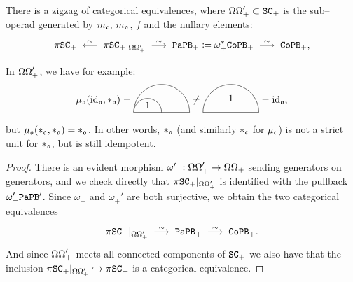 \begin{proposition} \label{sw.prop.zigzag-unit}
  There is a zigzag of categorical equivalences, where ${\Omega\Omega}_{+}' \subset \mathtt{SC}_{+}$ is the sub--operad generated by $m_{\mathfrak{c}}$, $m_{\mathfrak{o}}$, $f$ and the nullary elements:
  \[ \pi \SC_{+} \qiso* \pi \SC_{+}|_{\tMagma_{+}'} \qiso \PaPB_{+} \coloneqq \omega_{+}^{*} \CoPB_{+} \qiso \CoPB_{+}, \]
\end{proposition}

\begin{remark}
  In ${\Omega\Omega}_{+}'$, we have for example:
  \[ \mu_{\col{o}}(\id_{\col o}, *_{\col o}) =
    \begin{gathered} \begin{tikzpicture}
        \draw (-1,0) -- (1,0); \draw (1,0) arc (0:180:1);
        \draw (0,0) arc (0:180:0.5); \draw (-0.5, 0.25) node {1};
      \end{tikzpicture} \end{gathered}
    \neq
    \begin{gathered} \begin{tikzpicture}
        \draw (-1,0) -- (1,0); \draw (1,0) arc (0:180:1);
        \draw (0,0.5) node {1};
      \end{tikzpicture} \end{gathered}
    = \id_{\col{o}},
  \]
  but $\mu_{\mathfrak{o}}(*_{\mathfrak{o}}, *_{\mathfrak{o}}) = *_{\mathfrak{o}}$.
 In other words, $*_{\mathfrak{o}}$ (and similarly $*_{\mathfrak{c}}$ for $\mu_{\mathfrak{c}}$) is not a strict unit for $*_{\mathfrak{o}}$, but is still idempotent.
\end{remark}

\begin{proof}
  There is an evident morphism $\omega_{+}' : {\Omega\Omega}_{+}' \to {\Omega\Omega}_{+}$ sending generators on generators, and we check directly that $\pi \mathtt{SC}_{+}|_{{\Omega\Omega}_{+}'}$ is identified with the pullback $\omega_{+}' \mathtt{PaPB}'$.
  Since $\omega_{+}$ and $\omega_{+}'$ are both surjective, we obtain the two categorical equivalences
  \[ \pi \SC_{+}|_{\tMagma_{+}'} \qiso \PaPB_{+} \qiso \CoPB_{+}. \]
  And since ${\Omega\Omega}_{+}'$ meets all connected components of $\mathtt{SC}_{+}$ we also have that the inclusion $\pi \mathtt{SC}_{+}|_{{\Omega\Omega}_{+}'} \hookrightarrow \pi \mathtt{SC}_{+}$ is a categorical equivalence.
\end{proof}

